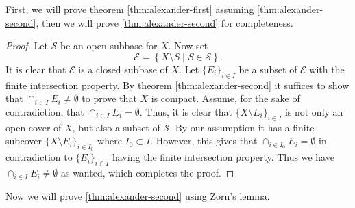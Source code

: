 \documentclass[11pt,a4paper]{article}
\theoremstyle{definition}
\theoremstyle{plain}
\newcommand{\set}[2]{ \left\{ #1 \mid #2 \right\} }
\begin{document}
  First, we will prove theorem \autoref{thm:alexander-first} assuming
  \autoref{thm:alexander-second}, then we will prove 
  \autoref{thm:alexander-second} for completeness.
  \begin{proof}
    Let $\mathcal S$ be an open subbase for $X$. Now set
    \[
      \mathcal E = \set{X \setminus S}{S \in \mathcal S}.
    \]
    It is clear that $\mathcal E$ is a closed subbase of $X$.
    Let $\{E_i\}_{i \in I}$ be a subset of $\mathcal E$ with the finite
    intersection property.
    By theorem \autoref{thm:alexander-second} it suffices to show that
    $\cap_{i \in I}{E_i} \neq \emptyset$ to prove that $X$ is compact.
    Assume, for the sake of contradiction, 
    that $\cap_{i \in I}{E_i} = \emptyset$.
    Thus, it is clear that $\{X \setminus E_i\}_{i \in I}$ is not only an
    open cover of $X$, but also a subset of $\mathcal S$. By our assumption
    it has a finite subcover $\{X \setminus E_i\}_{i \in I_0}$
    where $I_0 \subset I$. However, this gives that
    $\cap_{i \in I_0} E_i = \emptyset$ in contradiction to $\{E_i\}_{i \in I}$
    having the finite intersection property.
    Thus we have $\cap_{i \in I}{E_i} \neq \emptyset$ as wanted, which
    completes the proof.
  \end{proof}

  Now we will prove \autoref{thm:alexander-second} using Zorn's lemma.
\end{document}
